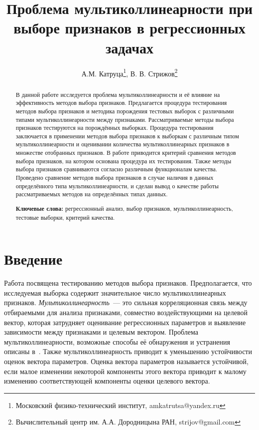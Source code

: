\documentclass[a4paper,12pt]{article}
\begin{document}
\title{Проблема мультиколлинеарности при выборе признаков в регрессионных задачах}
\author{А.М. Катруца\thanks{Московский физико-технический институт, amkatrutsa@yandex.ru}, В. В. Стрижов\thanks{Вычислительный центр им. А.А. Дородницына РАН, strijov@gmail.com}}
\date{}
\maketitle

\begin{abstract}
В данной работе исследуется проблема мультиколлинеарности и её влияние на эффективность методов выбора признаков. Предлагается процедура тестирования методов выбора признаков и методика порождения тестовых выборок с различными типами мультиколлинеарности между признаками. Рассматриваемые методы выбора признаков тестируются на порождённых выборках. Процедура тестирования заключается в применении методов выбора признаков к выборкам с различным типом мультиколлинеарности и оценивании количества мультиколлинеарных признаков в множестве отобранных признаков. В работе приводится критерий сравнения методов выбора признаков, на котором основана процедура их тестирования. Также методы выбора признаков сравниваются согласно различным функционалам качества. Проведено сравнение методов выбора признаков в случае наличия в данных определённого типа мультиколлинеарности, и сделан вывод о качестве работы рассматриваемых методов на определённых типах данных.  

\textbf{Ключевые слова:} регрессионный анализ, выбор признаков, мультиколлинеарность, тестовые выборки, критерий качества. 
\end{abstract}

\section{Введение}
 
Работа посвящена тестированию методов выбора признаков. Предполагается, что исследуемая выборка содержит значительное число мультиколлинеарных признаков. \emph{Мультиколлинеарность}~--- это сильная корреляционная связь между отбираемыми для анализа признаками, совместно воздействующими на целевой вектор, которая затрудняет оценивание регрессионных параметров и выявление зависимости между признаками и целевым вектором. Проблема мультиколлинеарности, возможные способы её обнаружения и устранения описаны в~\cite{multRegression,multBayesInterpret,belsley2005regression}. Также мультиколлинеарность приводит к уменьшению устойчивости оценок вектора параметров. Оценка вектора параметров называется устойчивой, если малое изменении некоторой компоненты этого вектора приводит к малому изменению соответствующей компоненты оценки целевого вектора.
\end{document}
